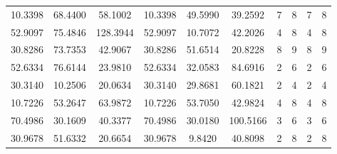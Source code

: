 \documentclass[withoutpreface,bwprint]{cumcmthesis}
\begin{document}
\begin{appendices}
\begin{table}[htbp!]
\begin{tabular}{@{}cccccccccc@{}}
				10.3398                          & 68.4400                          & 58.1002                          & 10.3398                          & 49.5990                          & 39.2592                          & 7                    & 8                    & 7                      & 8                      \\
				52.9097                          & 75.4846                          & 128.3944                         & 52.9097                          & 10.7072                          & 42.2026                          & 4                    & 8                    & 4                      & 8                      \\
				30.8286                          & 73.7353                          & 42.9067                          & 30.8286                          & 51.6514                          & 20.8228                          & 8                    & 9                    & 8                      & 9                      \\
				52.6334                          & 76.6144                          & 23.9810                          & 52.6334                          & 32.0583                          & 84.6916                          & 2                    & 6                    & 2                      & 6                      \\
				30.3140                          & 10.2506                          & 20.0634                          & 30.3140                          & 29.8681                          & 60.1821                          & 2                    & 4                    & 2                      & 4                      \\
				10.7226                          & 53.2647                          & 63.9872                          & 10.7226                          & 53.7050                          & 42.9824                          & 4                    & 8                    & 4                      & 8                      \\
				70.4986                          & 30.1609                          & 40.3377                          & 70.4986                          & 30.0180                          & 100.5166                         & 3                    & 6                    & 3                      & 6                      \\
				30.9678                          & 51.6332                          & 20.6654                          & 30.9678                          & 9.8420                           & 40.8098                          & 2                    & 8                    & 2                      & 8                      \\

\end{tabular}
\end{table}
\end{appendices}
\end{document}
